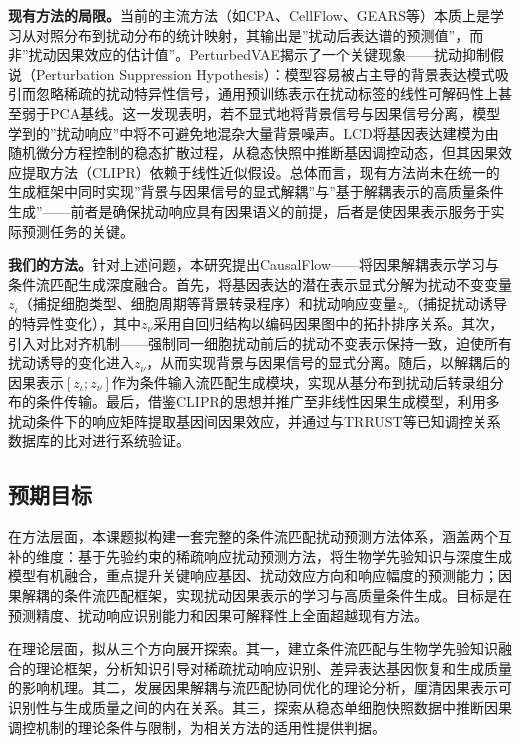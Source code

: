 \textbf{现有方法的局限。}当前的主流方法（如CPA、CellFlow、GEARS等）本质上是学习从对照分布到扰动分布的统计映射，其输出是”扰动后表达谱的预测值”，而非”扰动因果效应的估计值”。PerturbedVAE\cite{jiang2025what}揭示了一个关键现象——扰动抑制假说（Perturbation Suppression Hypothesis）：模型容易被占主导的背景表达模式吸引而忽略稀疏的扰动特异性信号，通用预训练表示在扰动标签的线性可解码性上甚至弱于PCA基线。这一发现表明，若不显式地将背景信号与因果信号分离，模型学到的”扰动响应”中将不可避免地混杂大量背景噪声。LCD\cite{lorch2025latent}将基因表达建模为由随机微分方程控制的稳态扩散过程，从稳态快照中推断基因调控动态，但其因果效应提取方法（CLIPR）依赖于线性近似假设。总体而言，现有方法尚未在统一的生成框架中同时实现”背景与因果信号的显式解耦”与”基于解耦表示的高质量条件生成”——前者是确保扰动响应具有因果语义的前提，后者是使因果表示服务于实际预测任务的关键。

\textbf{我们的方法。}针对上述问题，本研究提出CausalFlow——将因果解耦表示学习与条件流匹配生成深度融合。首先，将基因表达的潜在表示显式分解为扰动不变变量$z_\iota$（捕捉细胞类型、细胞周期等背景转录程序）和扰动响应变量$z_\nu$（捕捉扰动诱导的特异性变化），其中$z_\nu$采用自回归结构以编码因果图中的拓扑排序关系。其次，引入对比对齐机制——强制同一细胞扰动前后的扰动不变表示保持一致，迫使所有扰动诱导的变化进入$z_\nu$，从而实现背景与因果信号的显式分离。随后，以解耦后的因果表示$[z_\iota; z_\nu]$作为条件输入流匹配生成模块，实现从基分布到扰动后转录组分布的条件传输。最后，借鉴CLIPR\cite{lorch2025latent}的思想并推广至非线性因果生成模型，利用多扰动条件下的响应矩阵提取基因间因果效应，并通过与TRRUST等已知调控关系数据库的比对进行系统验证。

\subsection{预期目标}

在方法层面，本课题拟构建一套完整的条件流匹配扰动预测方法体系，涵盖两个互补的维度：基于先验约束的稀疏响应扰动预测方法，将生物学先验知识与深度生成模型有机融合，重点提升关键响应基因、扰动效应方向和响应幅度的预测能力；因果解耦的条件流匹配框架，实现扰动因果表示的学习与高质量条件生成。目标是在预测精度、扰动响应识别能力和因果可解释性上全面超越现有方法。

在理论层面，拟从三个方向展开探索。其一，建立条件流匹配与生物学先验知识融合的理论框架，分析知识引导对稀疏扰动响应识别、差异表达基因恢复和生成质量的影响机理。其二，发展因果解耦与流匹配协同优化的理论分析，厘清因果表示可识别性与生成质量之间的内在关系。其三，探索从稳态单细胞快照数据中推断因果调控机制的理论条件与限制，为相关方法的适用性提供判据。

